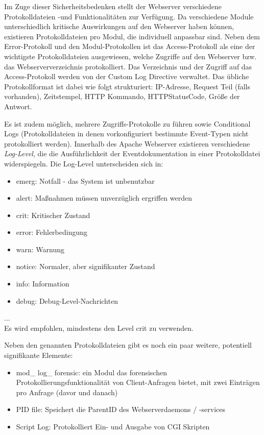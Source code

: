Im Zuge dieser Sicherheitsbedenken stellt der Webserver verschiedene Protokolldateien -und Funktionalitäten zur Verfügung. Da verschiedene Module unterschiedlich kritische Auswirkungen auf den Webserver haben können, existieren Protokolldateien pro Modul, die individuell anpassbar sind. 
Neben dem Error-Protokoll und den Modul-Protokollen ist das Access-Protokoll als eine der wichtigste Protokolldateien ausgewiesen, welche Zugriffe auf den Webserver bzw. das Webserververzeichnis protokolliert.
Das Verzeichnis und der Zugriff auf das Access-Protokoll werden von der \glqq Custom Log Directive\grqq{}  verwaltet. Das übliche Protokollformat ist dabei wie folgt strukturiert:
\glqq IP-Adresse, Request Teil (falls vorhanden), Zeitstempel, HTTP Kommando, HTTPStatusCode, Größe der Antwort\grqq.

Es ist zudem möglich, mehrere Zugriffs-Protokolle zu führen sowie \glqq Conditional Logs\grqq{}  (Protokolldateien in denen vorkonfiguriert bestimmte Event-Typen nicht protokolliert werden). 
Innerhalb des Apache Webserver existieren verschiedene \textit{Log-Level}, die die Ausführlichkeit der Eventdokumentation in einer Protokolldatei widerspiegeln. Die Log-Level unterscheiden sich in:
\glqq 
\begin{itemize}
\item emerg: Notfall - das System ist unbenutzbar
\item alert: Maßnahmen müssen unverzüglich ergriffen werden
\item crit: Kritischer Zustand
\item error: Fehlerbedingung
\item warn: Warnung
\item notice: Normaler, aber signifikanter Zustand
\item info: Information
\item debug: Debug-Level-Nachrichten
\end{itemize}
...\\
Es wird empfohlen, mindestens den Level crit zu verwenden.\grqq \citep{Apache2} %


Neben den genannten Protokolldateien gibt es noch ein paar weitere, potentiell signifikante Elemente:
\begin{itemize}
\item \glqq mod\_ log\_ forensic\grqq : ein Modul das forensischen Protokollierungsfunktionalität von Client-Anfragen bietet, mit zwei Einträgen pro Anfrage (davor und danach)
\item \glqq PID file\grqq : Speichert die ParentID des Webserverdaemons / -services
\item \glqq Script Log\grqq : Protokolliert Ein- und Ausgabe von CGI Skripten
\end{itemize}

